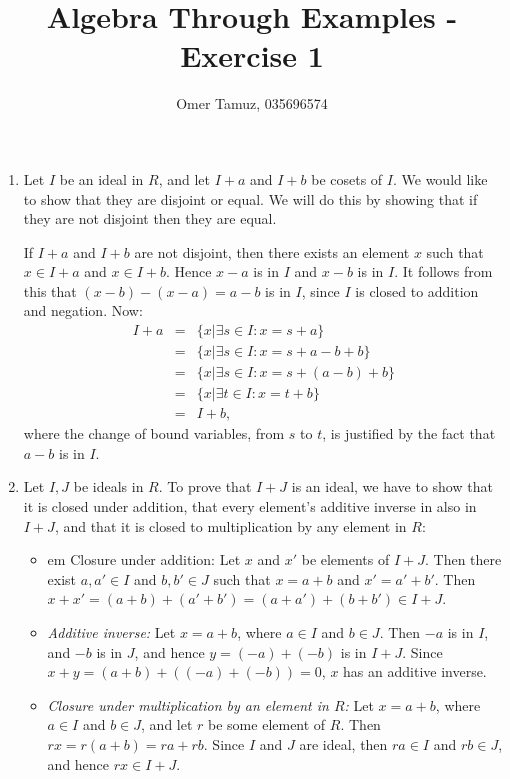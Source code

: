 \documentclass[11pt]{article} \usepackage{amssymb}
\begin{document}
\title{Algebra Through Examples - Exercise 1}

 \author{Omer Tamuz, 035696574}
\maketitle


\begin{enumerate}
  \item Let $I$ be an ideal in $R$, and let $I+a$ and $I+b$ be cosets of $I$. We
    would like to show that they are disjoint or equal. We will do this by
    showing that if they are not disjoint then they are equal. 
    
    If $I+a$ and $I+b$ are not disjoint, then there exists an element $x$
    such that $x\in I+a$ and $x\in I+b$. Hence $x-a$ is in $I$ and $x-b$ is
    in $I$. It follows from this that $(x-b)-(x-a)=a-b$ is in $I$, since $I$ is
    closed to addition and negation. Now:
    \begin{eqnarray*}
      I+a&=&\{x|\exists s\in I:x=s+a\}
      \\ &=& \{x|\exists s\in I:x=s+a-b+b\}
      \\ &=& \{x|\exists s\in I:x=s+(a-b)+b\}
      \\ &=& \{x|\exists t\in I:x=t+b\}
      \\ &=& I+b,
    \end{eqnarray*}
    where the change of bound variables, from $s$ to $t$, is justified by the
    fact that $a-b$ is in $I$.
    
  \item Let $I,J$ be ideals in $R$.
    To prove that $I+J$ is an ideal, 
    we have to show that it is closed
    under addition, that every element's
    additive inverse in also in $I+J$, and that it is closed to 
    multiplication by any element in $R$:
    \begin{itemize}
    \item {em Closure under addition:} Let $x$ and $x'$ be 
      elements of $I+J$. Then there exist $a,a'\in I$ and $b,b'\in J$
      such that $x=a+b$ and $x'=a'+b'$. 
      Then $x+x'=(a+b)+(a'+b')=(a+a')+(b+b')\in I+J$.
      \item {\em Additive inverse:} Let $x=a+b$, where $a\in I$ and $b\in J$.
        Then $-a$ is in $I$, and $-b$ is in $J$, and hence $y=(-a)+(-b)$
        is in $I+J$. Since $x+y=(a+b)+((-a)+(-b))=0$, $x$ has an additive
        inverse.
      \item{\em Closure under multiplication by an element in $R$:}
        Let $x=a+b$, where $a\in I$ and $b\in J$, and let $r$ be some element
        of $R$. Then $rx=r(a+b)=ra+rb$. Since $I$ and $J$ are ideal, then
        $ra\in I$ and $rb\in J$, and hence $rx\in I+J$.
      

\end{itemize}
\end{enumerate}
\end{document}
